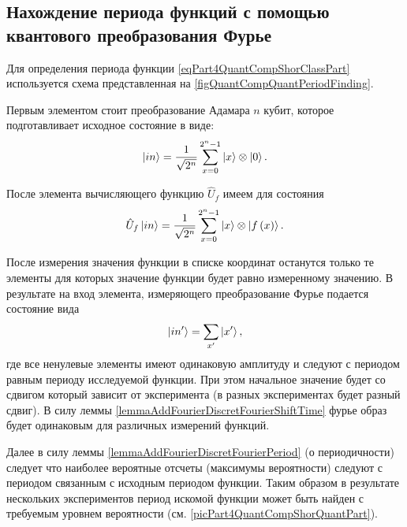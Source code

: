 \subsection{Нахождение периода функций с помощью квантового
  преобразования Фурье}

Для определения периода функции \eqref{eqPart4QuantCompShorClassPart}
используется схема представленная на
\autoref{figQuantCompQuantPeriodFinding}.



Первым элементом стоит преобразование Адамара $n$ кубит,
которое
подготавливает исходное состояние в виде:
\begin{equation}
\ket{in} = \frac{1}{\sqrt{2^n}}\sum_{x=0}^{2^n - 1} \ket{x}
\otimes\ket{0}.
\nonumber
\end{equation}

После элемента вычисляющего функцию $\hat{U}_f$ имеем для состояния
\begin{equation}
\hat{U}_f\ket{in} = \frac{1}{\sqrt{2^n}}\sum_{x=0}^{2^n - 1} \ket{x}
\otimes\left|f\left(x\right)\right>.
\nonumber
\end{equation} 



После измерения значения функции в списке координат останутся только
те элементы для которых значение функции будет равно измеренному
значению. В результате на вход элемента, измеряющего преобразование
Фурье подается состояние вида 
\begin{equation}
\ket{in'} = \sum_{x'} \ket{x'},
\nonumber
\end{equation} 
где все ненулевые элементы имеют одинаковую амплитуду и следуют с
периодом равным периоду исследуемой функции. При этом начальное
значение будет со сдвигом который зависит от эксперимента (в разных
экспериментах будет разный сдвиг). В силу леммы
\ref{lemmaAddFourierDiscretFourierShiftTime} фурье образ будет
одинаковым для различных измерений функций.

Далее в силу леммы \ref{lemmaAddFourierDiscretFourierPeriod}
(о периодичности) следует что наиболее вероятные отсчеты (максимумы
вероятности) следуют с периодом связанным с исходным периодом
функции. Таким образом в результате нескольких экспериментов период
искомой функции может быть найден с требуемым уровнем вероятности
(см. \autoref{picPart4QuantCompShorQuantPart}).

